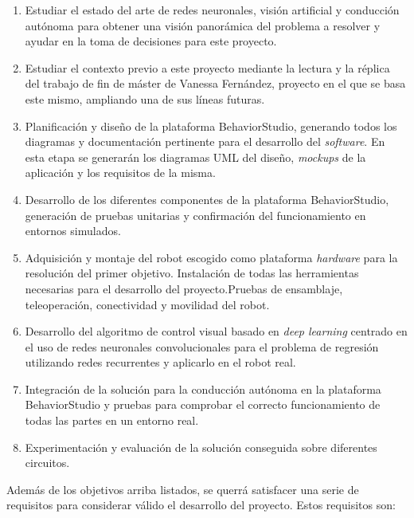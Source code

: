 \begin{enumerate}
    \item Estudiar el estado del arte de redes neuronales, visión artificial y conducción autónoma para obtener una visión panorámica del problema a resolver y ayudar en la toma de decisiones para este proyecto.
    \item Estudiar el contexto previo a este proyecto mediante la lectura y la réplica del trabajo de fin de máster de Vanessa Fernández, proyecto en el que se basa este mismo, ampliando una de sus líneas futuras.
    \item Planificación y diseño de la plataforma BehaviorStudio, generando todos los diagramas y documentación pertinente para el desarrollo del \textit{software}. En esta etapa se generarán los diagramas UML del diseño, \textit{mockups} de la aplicación y los requisitos de la misma.
    \item Desarrollo de los diferentes componentes de la plataforma BehaviorStudio, generación de pruebas unitarias y confirmación del funcionamiento en entornos simulados.
    \item Adquisición y montaje del robot escogido como plataforma \textit{hardware} para la resolución del primer objetivo. Instalación de todas las herramientas necesarias para el desarrollo del proyecto.Pruebas de ensamblaje, teleoperación, conectividad y movilidad del robot. 
    \item Desarrollo del algoritmo de control visual basado en \textit{deep learning} centrado en el uso de redes neuronales convolucionales para el problema de regresión utilizando redes recurrentes y aplicarlo en el robot real.
    \item Integración de la solución para la conducción autónoma en la plataforma BehaviorStudio y pruebas para comprobar el correcto funcionamiento de todas las partes en un entorno real.
    \item Experimentación y evaluación de la solución conseguida sobre diferentes circuitos.
    
\end{enumerate}

\noindent Además de los objetivos arriba listados, se querrá satisfacer una serie de requisitos para considerar válido el desarrollo del proyecto. Estos requisitos son:

